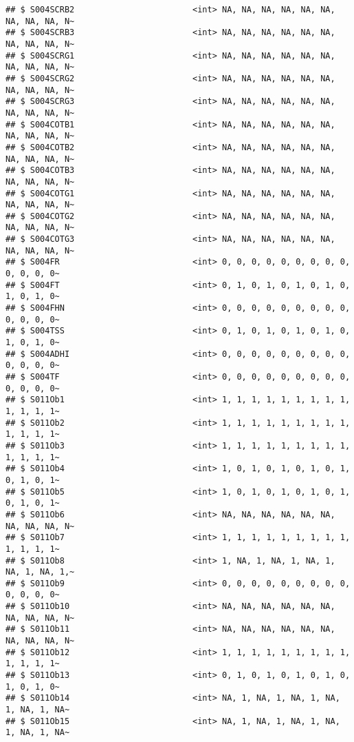 \documentclass[
]{article}
\begin{document}
\begin{verbatim}
## $ S004SCRB2                        <int> NA, NA, NA, NA, NA, NA, NA, NA, NA, N~
## $ S004SCRB3                        <int> NA, NA, NA, NA, NA, NA, NA, NA, NA, N~
## $ S004SCRG1                        <int> NA, NA, NA, NA, NA, NA, NA, NA, NA, N~
## $ S004SCRG2                        <int> NA, NA, NA, NA, NA, NA, NA, NA, NA, N~
## $ S004SCRG3                        <int> NA, NA, NA, NA, NA, NA, NA, NA, NA, N~
## $ S004COTB1                        <int> NA, NA, NA, NA, NA, NA, NA, NA, NA, N~
## $ S004COTB2                        <int> NA, NA, NA, NA, NA, NA, NA, NA, NA, N~
## $ S004COTB3                        <int> NA, NA, NA, NA, NA, NA, NA, NA, NA, N~
## $ S004COTG1                        <int> NA, NA, NA, NA, NA, NA, NA, NA, NA, N~
## $ S004COTG2                        <int> NA, NA, NA, NA, NA, NA, NA, NA, NA, N~
## $ S004COTG3                        <int> NA, NA, NA, NA, NA, NA, NA, NA, NA, N~
## $ S004FR                           <int> 0, 0, 0, 0, 0, 0, 0, 0, 0, 0, 0, 0, 0~
## $ S004FT                           <int> 0, 1, 0, 1, 0, 1, 0, 1, 0, 1, 0, 1, 0~
## $ S004FHN                          <int> 0, 0, 0, 0, 0, 0, 0, 0, 0, 0, 0, 0, 0~
## $ S004TSS                          <int> 0, 1, 0, 1, 0, 1, 0, 1, 0, 1, 0, 1, 0~
## $ S004ADHI                         <int> 0, 0, 0, 0, 0, 0, 0, 0, 0, 0, 0, 0, 0~
## $ S004TF                           <int> 0, 0, 0, 0, 0, 0, 0, 0, 0, 0, 0, 0, 0~
## $ S011Ob1                          <int> 1, 1, 1, 1, 1, 1, 1, 1, 1, 1, 1, 1, 1~
## $ S011Ob2                          <int> 1, 1, 1, 1, 1, 1, 1, 1, 1, 1, 1, 1, 1~
## $ S011Ob3                          <int> 1, 1, 1, 1, 1, 1, 1, 1, 1, 1, 1, 1, 1~
## $ S011Ob4                          <int> 1, 0, 1, 0, 1, 0, 1, 0, 1, 0, 1, 0, 1~
## $ S011Ob5                          <int> 1, 0, 1, 0, 1, 0, 1, 0, 1, 0, 1, 0, 1~
## $ S011Ob6                          <int> NA, NA, NA, NA, NA, NA, NA, NA, NA, N~
## $ S011Ob7                          <int> 1, 1, 1, 1, 1, 1, 1, 1, 1, 1, 1, 1, 1~
## $ S011Ob8                          <int> 1, NA, 1, NA, 1, NA, 1, NA, 1, NA, 1,~
## $ S011Ob9                          <int> 0, 0, 0, 0, 0, 0, 0, 0, 0, 0, 0, 0, 0~
## $ S011Ob10                         <int> NA, NA, NA, NA, NA, NA, NA, NA, NA, N~
## $ S011Ob11                         <int> NA, NA, NA, NA, NA, NA, NA, NA, NA, N~
## $ S011Ob12                         <int> 1, 1, 1, 1, 1, 1, 1, 1, 1, 1, 1, 1, 1~
## $ S011Ob13                         <int> 0, 1, 0, 1, 0, 1, 0, 1, 0, 1, 0, 1, 0~
## $ S011Ob14                         <int> NA, 1, NA, 1, NA, 1, NA, 1, NA, 1, NA~
## $ S011Ob15                         <int> NA, 1, NA, 1, NA, 1, NA, 1, NA, 1, NA~

\end{verbatim}
\end{document}
